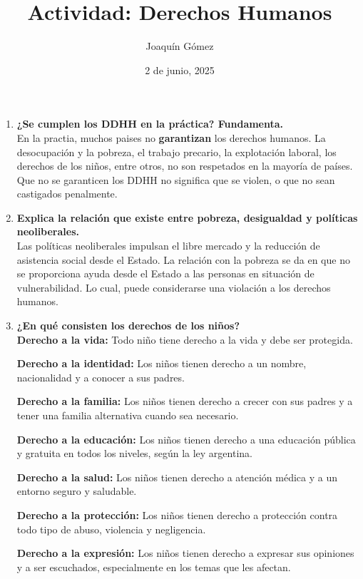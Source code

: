 \documentclass[a4paper,11pt]{article}
\title{Actividad: Derechos Humanos}
\date{2 de junio, 2025}
\author{Joaquín Gómez}
\begin{document}
\maketitle

\begin{enumerate}
    \item \textbf{¿Se cumplen los DDHH en la práctica? Fundamenta.} \\
    En la practia, muchos paises no \textbf{garantizan} los derechos humanos. La desocupación y la pobreza, el trabajo precario, la explotación laboral, los derechos de los niños, entre otros, no son respetados en la mayoría de países. Que no se garanticen los DDHH no significa que se violen, o que no sean castigados penalmente.

    \item \textbf{Explica la relación que existe entre pobreza, desigualdad y políticas neoliberales.} \\
    Las políticas neoliberales impulsan el libre mercado y la reducción de asistencia social desde el Estado. La relación con la pobreza se da en que no se proporciona ayuda desde el Estado a las personas en situación de vulnerabilidad. Lo cual, puede considerarse una violación a los derechos humanos.

    \item \textbf{¿En qué consisten los derechos de los niños?} \\
    \textbf{Derecho a la vida:}
    Todo niño tiene derecho a la vida y debe ser protegida. 
    
    \textbf{Derecho a la identidad:}
    Los niños tienen derecho a un nombre, nacionalidad y a conocer a sus padres. 
    
    \textbf{Derecho a la familia:}
    Los niños tienen derecho a crecer con sus padres y a tener una familia alternativa cuando sea necesario. 
    
    \textbf{Derecho a la educación:}
    Los niños tienen derecho a una educación pública y gratuita en todos los niveles, según la ley argentina. 
    
    \textbf{Derecho a la salud:}
    Los niños tienen derecho a atención médica y a un entorno seguro y saludable. 
    
    \textbf{Derecho a la protección:}
    Los niños tienen derecho a protección contra todo tipo de abuso, violencia y negligencia. 
    
    \textbf{Derecho a la expresión:}
    Los niños tienen derecho a expresar sus opiniones y a ser escuchados, especialmente en los temas que les afectan. 
    

\end{enumerate}
\end{document}
